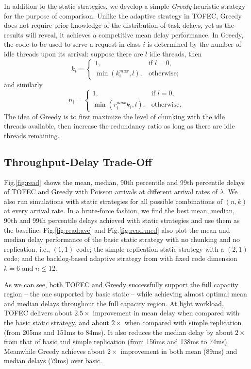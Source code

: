 \documentclass[journal]{IEEEtran}
\newcommand{\ourproposal}{TOFEC\xspace}
\begin{document}
In addition to the static strategies, we develop a simple {\em Greedy} heuristic strategy for the purpose of comparison. Unlike the adaptive strategy in \ourproposal, Greedy does not require prior-knowledge of the distribution of task delays, yet as the results will reveal, it achieves a competitive mean delay performance. In Greedy, the code to be used to serve a request in class $i$ is determined by the number of idle threads upon its arrival: suppose there are $l$ idle threads, then
$$
k_i = 
\begin{cases}
1, & \mbox{if } l=0,\\
\min(k_i^{max},l), & \mbox{otherwise};
\end{cases}
$$
and similarly
$$
n_i = 
\begin{cases}
1, & \mbox{if } l=0,\\
\min(r_i^{max}k_i,l), & \mbox{otherwise}.
\end{cases}
$$
The idea of Greedy is to first maximize the level of chunking with the idle threads available, then increase the redundancy ratio as long as there are idle threads remaining. 







\subsection{Throughput-Delay Trade-Off}
Fig.\ref{fig:read} shows the mean, median, 90th percentile and 99th percentile delays of  \ourproposal and Greedy with Poisson arrivals at different arrival rates of $\lambda$. We also run simulations with static strategies for all possible combinations of $(n,k)$ at every arrival rate. In a brute-force fashion, we find the best mean, median, 90th and 99th percentile delays achieved with static strategies and use them as the baseline. 
Fig.\ref{fig:read:ave} and Fig.\ref{fig:read:med} also plot the mean and median delay performance of the basic static strategy with no chunking and no replication, i.e., $(1,1)$ code; the simple replication static strategy with a $(2,1)$ code; and the backlog-based adaptive strategy from \cite{fastcloud} with fixed code dimension $k=6$ and $n\le 12$. 



As we can see, 
both \ourproposal and Greedy successfully support the full capacity region -- the one supported by basic static -- while achieving almost optimal mean and median delays throughout the full capacity region.
At light workload, \ourproposal delivers about $2.5\times$ improvement in mean delay when compared with the basic static strategy, and about $2\times$ when compared with simple replication (from 205ms and 151ms to 84ms). It also reduces the median delay by about $2\times$ from that of basic and simple replication (from 156ms and 138ms to 74ms). Meanwhile Greedy achieves about $2\times$ improvement in both mean (89ms) and median delays (79ms) over basic. 
\end{document}
